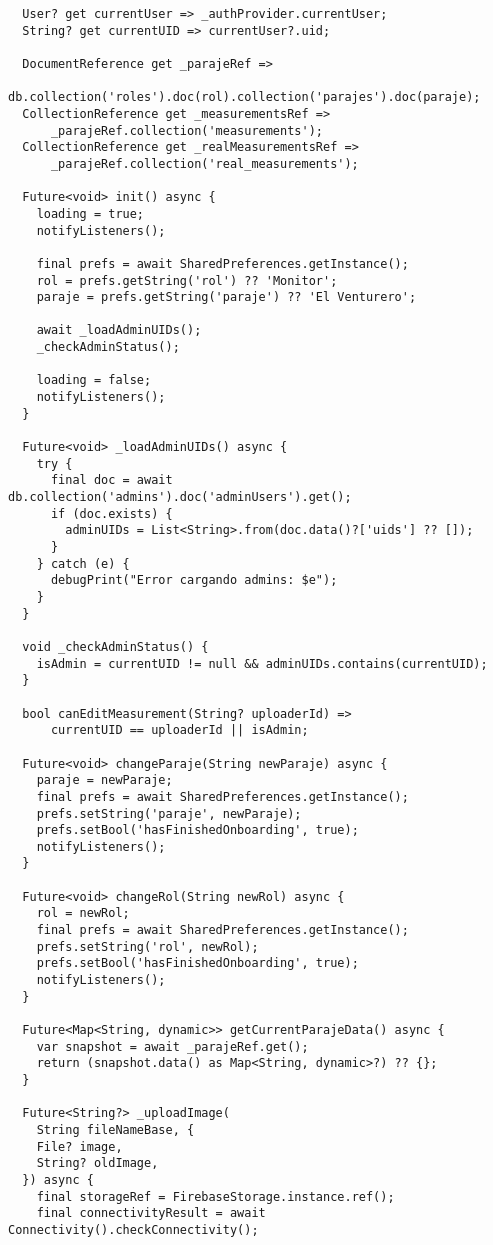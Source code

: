 \begin{verbatim}
  User? get currentUser => _authProvider.currentUser;
  String? get currentUID => currentUser?.uid;

  DocumentReference get _parajeRef =>
      db.collection('roles').doc(rol).collection('parajes').doc(paraje);
  CollectionReference get _measurementsRef =>
      _parajeRef.collection('measurements');
  CollectionReference get _realMeasurementsRef =>
      _parajeRef.collection('real_measurements');

  Future<void> init() async {
    loading = true;
    notifyListeners();

    final prefs = await SharedPreferences.getInstance();
    rol = prefs.getString('rol') ?? 'Monitor';
    paraje = prefs.getString('paraje') ?? 'El Venturero';

    await _loadAdminUIDs();
    _checkAdminStatus();

    loading = false;
    notifyListeners();
  }

  Future<void> _loadAdminUIDs() async {
    try {
      final doc = await db.collection('admins').doc('adminUsers').get();
      if (doc.exists) {
        adminUIDs = List<String>.from(doc.data()?['uids'] ?? []);
      }
    } catch (e) {
      debugPrint("Error cargando admins: $e");
    }
  }

  void _checkAdminStatus() {
    isAdmin = currentUID != null && adminUIDs.contains(currentUID);
  }

  bool canEditMeasurement(String? uploaderId) =>
      currentUID == uploaderId || isAdmin;

  Future<void> changeParaje(String newParaje) async {
    paraje = newParaje;
    final prefs = await SharedPreferences.getInstance();
    prefs.setString('paraje', newParaje);
    prefs.setBool('hasFinishedOnboarding', true);
    notifyListeners();
  }

  Future<void> changeRol(String newRol) async {
    rol = newRol;
    final prefs = await SharedPreferences.getInstance();
    prefs.setString('rol', newRol);
    prefs.setBool('hasFinishedOnboarding', true);
    notifyListeners();
  }

  Future<Map<String, dynamic>> getCurrentParajeData() async {
    var snapshot = await _parajeRef.get();
    return (snapshot.data() as Map<String, dynamic>?) ?? {};
  }

  Future<String?> _uploadImage(
    String fileNameBase, {
    File? image,
    String? oldImage,
  }) async {
    final storageRef = FirebaseStorage.instance.ref();
    final connectivityResult = await Connectivity().checkConnectivity();


\end{verbatim}
